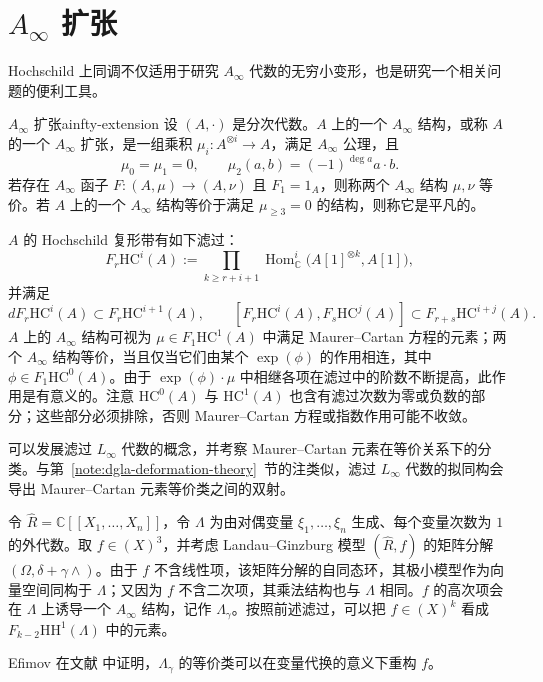 \section{\texorpdfstring{$A_\infty$}{A-infinity} 扩张}\label{sec:ainfty-extensions}

Hochschild 上同调不仅适用于研究 $A_\infty$ 代数的无穷小变形，也是研究一个相关问题的便利工具。

\begin{definition}{$A_\infty$ 扩张}{ainfty-extension}
设 $(A,\cdot)$ 是分次代数。$A$ 上的一个 $A_\infty$ 结构，或称 $A$ 的一个 $A_\infty$ 扩张，是一组乘积 $\mu_i:A^{\otimes i}\to A$，满足 $A_\infty$ 公理，且
\[
  \mu_0=\mu_1=0,\qquad \mu_2(a,b)=(-1)^{\deg a}a\cdot b.
\]
若存在 $A_\infty$ 函子 $F:(A,\mu)\to(A,\nu)$ 且 $F_1=1_A$，则称两个 $A_\infty$ 结构 $\mu,\nu$ 等价。若 $A$ 上的一个 $A_\infty$ 结构等价于满足 $\mu_{\geq3}=0$ 的结构，则称它是平凡的。
\end{definition}

$A$ 的 Hochschild 复形带有如下滤过：
\[
  F_r\mathrm{HC}^{i}(A)
  :=\prod_{k\geq r+i+1}\operatorname{Hom}^{i}_{\mathbb C}\bigl(A[1]^{\otimes k},A[1]\bigr),
\]
并满足
\[
  dF_r\mathrm{HC}^{i}(A)\subset F_r\mathrm{HC}^{i+1}(A),\qquad
  [F_r\mathrm{HC}^{i}(A),F_s\mathrm{HC}^{j}(A)]
  \subset F_{r+s}\mathrm{HC}^{i+j}(A).
\]
$A$ 上的 $A_\infty$ 结构可视为 $\mu\in F_1\mathrm{HC}^{1}(A)$ 中满足 Maurer--Cartan 方程的元素；两个 $A_\infty$ 结构等价，当且仅当它们由某个 $\exp(\phi)$ 的作用相连，其中 $\phi\in F_1\mathrm{HC}^{0}(A)$。由于 $\exp(\phi)\cdot\mu$ 中相继各项在滤过中的阶数不断提高，此作用是有意义的。注意 $\mathrm{HC}^0(A)$ 与 $\mathrm{HC}^1(A)$ 也含有滤过次数为零或负数的部分；这些部分必须排除，否则 Maurer--Cartan 方程或指数作用可能不收敛。

\begin{note}
可以发展滤过 $L_\infty$ 代数的概念，并考察 Maurer--Cartan 元素在等价关系下的分类。与第~\ref{note:dgla-deformation-theory}~节的注类似，滤过 $L_\infty$ 代数的拟同构会导出 Maurer--Cartan 元素等价类之间的双射。
\end{note}

\begin{example}[由函数变形诱导的外代数扩张]
令 $\widehat R=\mathbb C[[X_1,\ldots,X_n]]$，令 $\Lambda$ 为由对偶变量 $\xi_1,\ldots,\xi_n$ 生成、每个变量次数为 $1$ 的外代数。取 $f\in(X)^3$，并考虑 Landau--Ginzburg 模型 $(\widehat R,f)$ 的矩阵分解 $(\Omega,\delta+\gamma\wedge)$。由于 $f$ 不含线性项，该矩阵分解的自同态环，其极小模型作为向量空间同构于 $\Lambda$；又因为 $f$ 不含二次项，其乘法结构也与 $\Lambda$ 相同。$f$ 的高次项会在 $\Lambda$ 上诱导一个 $A_\infty$ 结构，记作 $\Lambda_\gamma$。按照前述滤过，可以把 $f\in(X)^k$ 看成 $F_{k-2}\mathrm{HH}^1(\Lambda)$ 中的元素。

Efimov 在文献 中证明，$\Lambda_\gamma$ 的等价类可以在变量代换的意义下重构 $f$。
\end{example}

